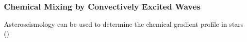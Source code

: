 {\color{purple}
\subsubsection{Chemical Mixing by Convectively Excited Waves}
}

Asteroseismology can be used to determine the chemical gradient profile in stars ()

